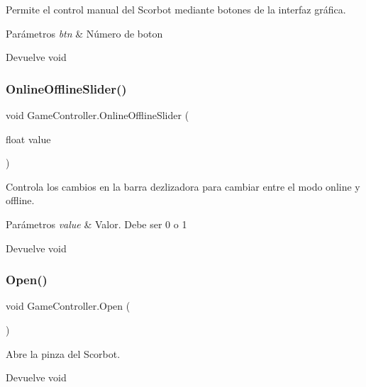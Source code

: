 Permite el control manual del Scorbot mediante botones de la interfaz gráfica. 
\begin{DoxyParams}{Parámetros}
{\em btn} & Número de boton \\
\hline
\end{DoxyParams}
\begin{DoxyReturn}{Devuelve}
void 
\end{DoxyReturn}
\mbox{\label{class_game_controller_a48800115bee7dd138485ca7cd1464f78}} 
\subsubsection{\texorpdfstring{OnlineOfflineSlider()}{OnlineOfflineSlider()}}
{\footnotesize\ttfamily void Game\+Controller.\+Online\+Offline\+Slider (\begin{DoxyParamCaption}\item[{float}]{value }\end{DoxyParamCaption})\hspace{0.3cm}{\ttfamily [inline]}}

Controla los cambios en la barra dezlizadora para cambiar entre el modo online y offline. 
\begin{DoxyParams}{Parámetros}
{\em value} & Valor. Debe ser 0 o 1 \\
\hline
\end{DoxyParams}
\begin{DoxyReturn}{Devuelve}
void 
\end{DoxyReturn}
\mbox{\label{class_game_controller_ab69f0ec04df1e4d52b182d1dddd0606c}} 
\subsubsection{\texorpdfstring{Open()}{Open()}}
{\footnotesize\ttfamily void Game\+Controller.\+Open (\begin{DoxyParamCaption}{ }\end{DoxyParamCaption})\hspace{0.3cm}{\ttfamily [inline]}}

Abre la pinza del Scorbot. \begin{DoxyReturn}{Devuelve}
void 
\end{DoxyReturn}
\mbox{\label{class_game_controller_aad5d8a92a01bb1b946890c227e36ba41}} 
